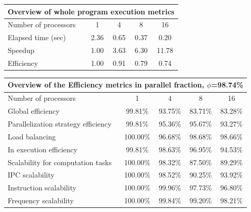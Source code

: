 \begin{tabular}{|l|c|c|c|c|}
\hline
\multicolumn{5}{|c|}{Overview of whole program execution metrics} \\
\hline
\hline
Number of processors & 1 & 4 & 8 & 16 \\
\hline
Elapsed time (sec)      &       2.36 &       0.65 &       0.37 &       0.20 \\
\hline
Speedup                 &       1.00 &       3.63 &       6.30 &      11.78 \\
\hline
Efficiency              &       1.00 &       0.91 &       0.79 &       0.74 \\
\hline
\end{tabular}
\vspace{2mm}
\begin{tabular}{|l|c|c|c|c|}
\hline
\multicolumn{5}{|c|}{Overview of the Efficiency metrics in parallel fraction, $\phi$=98.74\%} \\
\hline
\hline
Number of processors & 1 & 4 & 8 & 16 \\
\hline
\hline
Global efficiency                      &     99.81\% &     93.75\% &     83.71\% &     83.28\% \\
\hline
\hline
Parallelization strategy efficiency &     99.81\% &     95.36\% &     95.67\% &     93.27\% \\
\hline
Load balancing                   &    100.00\% &     96.68\% &     98.68\% &     98.66\% \\
In execution efficiency          &     99.81\% &     98.63\% &     96.95\% &     94.53\% \\
\hline
\hline
Scalability for computation tasks   &    100.00\% &     98.32\% &     87.50\% &     89.29\% \\
\hline
IPC scalability                  &    100.00\% &     98.52\% &     90.25\% &     93.92\% \\
Instruction scalability          &    100.00\% &     99.96\% &     97.73\% &     96.80\% \\
Frequency scalability            &    100.00\% &     99.84\% &     99.20\% &     98.21\% \\
\hline
\end{tabular}
\vspace{2mm}

